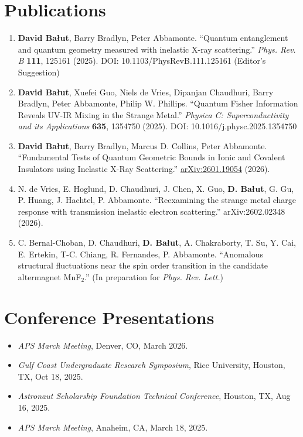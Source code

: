 \documentclass[10pt, letterpaper]{article}
\begin{document}
\section{Publications}
\vspace{2pt}
\begin{enumerate}[leftmargin=20pt, topsep=0pt, itemsep=4pt]

\item \textbf{David Bałut}, Barry Bradlyn, Peter Abbamonte. ``Quantum entanglement and quantum geometry measured with inelastic X-ray scattering.'' \textit{Phys. Rev. B} \textbf{111}, 125161 (2025). DOI: 10.1103/PhysRevB.111.125161 (Editor's Suggestion)

\item \textbf{David Bałut}, Xuefei Guo, Niels de Vries, Dipanjan Chaudhuri, Barry Bradlyn, Peter Abbamonte, Philip W. Phillips. ``Quantum Fisher Information Reveals UV-IR Mixing in the Strange Metal.'' \textit{Physica C: Superconductivity and its Applications} \textbf{635}, 1354750 (2025). DOI: 10.1016/j.physc.2025.1354750

\item \textbf{David Bałut}, Barry Bradlyn, Marcus D. Collins, Peter Abbamonte. ``Fundamental Tests of Quantum Geometric Bounds in Ionic and Covalent Insulators using Inelastic X-Ray Scattering.'' \href{https://arxiv.org/abs/2601.19054}{arXiv:2601.19054} (2026).

\item N. de Vries, E. Hoglund, D. Chaudhuri, J. Chen, X. Guo, \textbf{D. Bałut}, G. Gu, P. Huang, J. Hachtel, P. Abbamonte. ``Reexamining the strange metal charge response with transmission inelastic electron scattering.'' arXiv:2602.02348 (2026).

\item C. Bernal-Choban, D. Chaudhuri, \textbf{D. Bałut}, A. Chakraborty, T. Su, Y. Cai, E. Ertekin, T-C. Chiang, R. Fernandes, P. Abbamonte. ``Anomalous structural fluctuations near the spin order transition in the candidate altermagnet MnF$_2$.'' (In preparation for \textit{Phys. Rev. Lett.})

\end{enumerate}

\section{Conference Presentations}
\vspace{2pt}
\begin{itemize}[leftmargin=20pt, topsep=0pt]
\item \textit{APS March Meeting}, Denver, CO, March 2026.
\item \textit{Gulf Coast Undergraduate Research Symposium}, Rice University, Houston, TX, Oct 18, 2025.
\item \textit{Astronaut Scholarship Foundation Technical Conference}, Houston, TX, Aug 16, 2025.
\item \textit{APS March Meeting}, Anaheim, CA, March 18, 2025.
\end{itemize}
\end{document}
